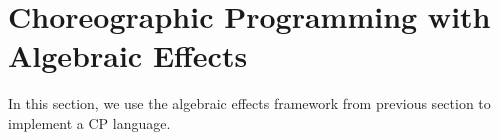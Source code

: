 \section{Choreographic Programming with Algebraic Effects}

In this section, we use the algebraic effects framework from previous section to implement a CP language.
